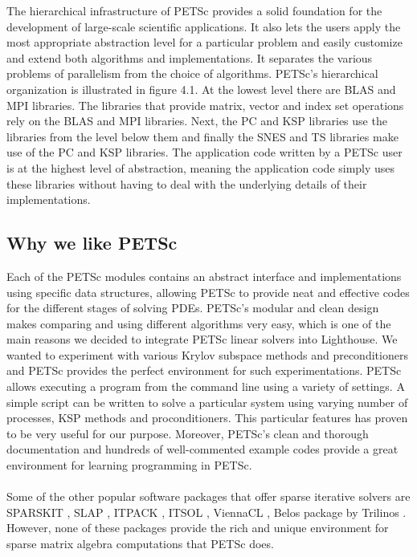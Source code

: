 \noindent  The hierarchical infrastructure of PETSc provides a solid foundation for the development of large-scale scientific applications. It also lets the users apply the most appropriate abstraction level for a particular problem and easily customize and extend both algorithms and implementations. It separates the various problems of parallelism from the choice of algorithms. PETSc's hierarchical organization is illustrated in figure 4.1. At the lowest level there are BLAS and MPI libraries. The libraries that provide matrix, vector and index set operations rely on the BLAS and MPI libraries. Next, the PC and KSP libraries use the libraries from the level below them and finally the SNES and TS libraries make use of the PC and KSP libraries. The application code written by a PETSc user is at the highest level of abstraction, meaning the application code simply uses these libraries without having to deal with the underlying details of their implementations.

\subsection{Why we like PETSc} Each of the PETSc modules contains an abstract interface and implementations using specific data structures, allowing PETSc to provide neat and effective codes for the different stages of solving PDEs. PETSc's modular and clean design makes comparing and using different algorithms very easy, which is one of the main reasons we decided to integrate PETSc linear solvers into Lighthouse. We wanted to experiment with various Krylov subspace methods and preconditioners and PETSc provides the perfect environment for such experimentations. PETSc allows executing a program from the command line using a variety of settings. A simple script can be written to solve a particular system using varying number of processes, KSP methods and proconditioners. This particular features has proven to be very useful for our purpose. Moreover,  PETSc's clean and thorough documentation and hundreds of well-commented example codes provide a great environment for learning programming in PETSc.

\paragraph{}
Some of the other popular software packages that offer sparse iterative solvers are SPARSKIT \cite{sparskit}, SLAP \cite{slap}, ITPACK \cite{itpack}, ITSOL \cite{itsol}, ViennaCL \cite{viennacl}, Belos package \cite{belos} by Trilinos \cite{trilinos}. However, none of these packages provide the rich and unique environment for sparse matrix algebra computations that PETSc does.

